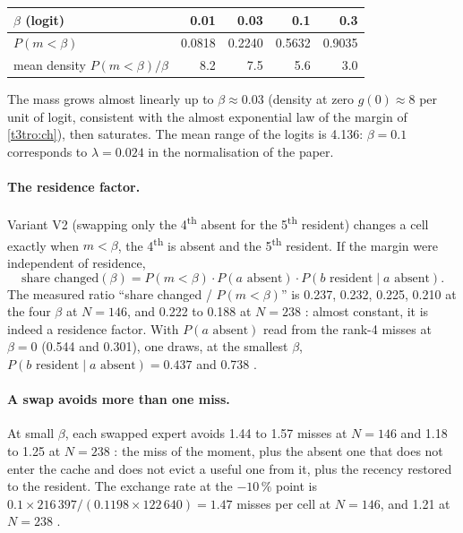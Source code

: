 \begin{center}\small
\begin{tabular}{@{}lrrrr@{}}
\toprule
$\beta$ (logit) & 0.01 & 0.03 & 0.1 & 0.3 \\
\midrule
$P(m < \beta)$ & 0.0818 & 0.2240 & 0.5632 & 0.9035 \\
mean density $P(m<\beta)/\beta$ & 8.2 & 7.5 & 5.6 & 3.0 \\
\bottomrule
\end{tabular}
\end{center}
The mass grows almost linearly up to $\beta \approx 0.03$ (density at zero $g(0) \approx 8$ per unit of logit, consistent with the almost exponential law of the margin of \cref{t3tro:ch}), then saturates. The mean range of the logits is 4.136: $\beta = 0.1$ corresponds to $\lambda = 0.024$ in the normalisation of the paper.

\paragraph{The residence factor.} Variant V2 (swapping only the 4\textsuperscript{th} absent for the 5\textsuperscript{th} resident) changes a cell exactly when $m < \beta$, the 4\textsuperscript{th} is absent and the 5\textsuperscript{th} resident. If the margin were independent of residence,
\begin{equation}\label{t3mim:eq:p3-part}
\text{share changed}(\beta) = P(m < \beta)\cdot P(a \text{ absent}) \cdot P(b \text{ resident} \mid a \text{ absent}).
\end{equation}
The measured ratio ``share changed / $P(m<\beta)$'' is 0.237, 0.232, 0.225, 0.210 at the four $\beta$ at $N = 146$, and 0.222 to 0.188 at $N = 238$ \mes: almost constant, it is indeed a residence factor. With $P(a \text{ absent})$ read from the rank-4 misses at $\beta = 0$ (0.544 and 0.301), one draws, at the smallest $\beta$, $P(b \text{ resident} \mid a \text{ absent}) = 0.437$ and 0.738 \calc.

\paragraph{A swap avoids more than one miss.} At small $\beta$, each swapped expert avoids 1.44 to 1.57 misses at $N = 146$ and 1.18 to 1.25 at $N = 238$ \mes: the miss of the moment, plus the absent one that does not enter the cache and does not evict a useful one from it, plus the recency restored to the resident. The exchange rate at the $-10\,\%$ point is $0.1 \times 216\,397 / (0.1198 \times 122\,640) = 1.47$ misses per cell at $N = 146$, and 1.21 at $N = 238$ \calc.

